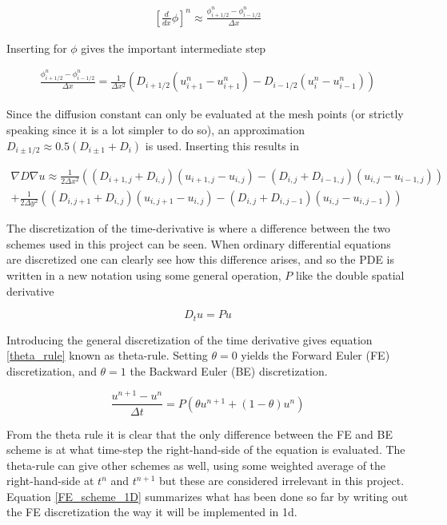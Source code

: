 \begin{align*}
  \left[\frac{d}{dx}\phi\right]^n \approx \frac{\phi^n_{i+1/2}-\phi^n_{i-1/2}}{\Delta x}
\end{align*}

Inserting for $\phi$ gives the important intermediate step

\begin{align*}
 \frac{\phi^n_{i+1/2}-\phi^n_{i-1/2}}{\Delta x} = \frac{1}{\Delta x^2}\left(D_{i+1/2}(u^n_{i+1}-u^n_{i+1}) -D_{i-1/2}(u^n_{i}-u^n_{i-1})\right)
\end{align*}

Since the diffusion constant can only be evaluated at the mesh points (or strictly speaking since it is a lot simpler to do so), an approximation $D_{i\pm1/2}\approx0.5(D_{i\pm1}+D_i)$ is used. 
Inserting this results in

\begin{align*}
 \nabla D\nabla u\approx\frac{1}{2\Delta x^2}\left((D_{i+1,j}+D_{i,j})(u_{i+1,j}-u_{i,j})-(D_{i,j}+D_{i-1,j})(u_{i,j}-u_{i-1,j})\right) \\
 +\frac{1}{2\Delta y^2}\left((D_{i,j+1}+D_{i,j})(u_{i,j+1}-u_{i,j})-(D_{i,j}+D_{i,j-1})(u_{i,j}-u_{i,j-1})\right)
\end{align*}

The discretization of the time-derivative is where a difference between the two schemes used in this project can be seen. 
When ordinary differential equations are discretized one can clearly see how this difference arises, and so the PDE  is written in a new notation using some general operation, $P$ like the double spatial derivative

\begin{equation}
 D_t u = Pu
\end{equation}

Introducing the general discretization of the time derivative gives equation \eqref{theta_rule} known as theta-rule. 
Setting $\theta = 0$ yields the Forward Euler (FE) discretization, and $\theta = 1$ the Backward Euler (BE) discretization. 

\begin{equation}\label{theta_rule}
 \frac{u^{n+1}-u^n}{\Delta t} = P\left(\theta u^{n+1} +(1-\theta)u^n\right)
\end{equation}

From the theta rule it is clear that the only difference between the FE and BE scheme is at what time-step the right-hand-side of the equation is evaluated. 
The theta-rule can give other schemes as well, using some weighted average of the right-hand-side at $t^n$ and $t^{n+1}$ but these are considered irrelevant in this project. 
Equation \ref{FE_scheme_1D} summarizes what has been done so far by writing out the FE discretization the way it will be implemented in 1d.

